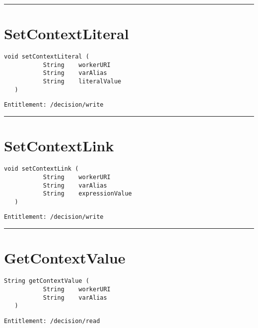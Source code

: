 \rule{12cm}{2pt}
\section{SetContextLiteral}
\label{Api:SetContextLiteral}
\begin{lstlisting}[style=nonumbers]
   void setContextLiteral (
           String    workerURI
           String    varAlias
           String    literalValue
   )
\end{lstlisting}
\begin{Verbatim}[formatcom=\color{Maroon}]
  Entitlement: /decision/write
\end{Verbatim}



\rule{12cm}{2pt}
\section{SetContextLink}
\label{Api:SetContextLink}
\begin{lstlisting}[style=nonumbers]
   void setContextLink (
           String    workerURI
           String    varAlias
           String    expressionValue
   )
\end{lstlisting}
\begin{Verbatim}[formatcom=\color{Maroon}]
  Entitlement: /decision/write
\end{Verbatim}



\rule{12cm}{2pt}
\section{GetContextValue}
\label{Api:GetContextValue}
\begin{lstlisting}[style=nonumbers]
   String getContextValue (
           String    workerURI
           String    varAlias
   )
\end{lstlisting}
\begin{Verbatim}[formatcom=\color{Maroon}]
  Entitlement: /decision/read
\end{Verbatim}



